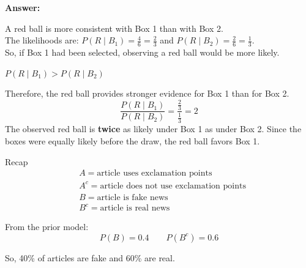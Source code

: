 \documentclass[12pt]{beamer}
\begin{document}
{\begin{frame}{}
\begin{block}{}
\begin{center}
\end{center}
\end{block}
\end{frame}

\begin{frame}{}
\begin{block}{}
\small
\textbf{Answer:}
{\color{blue}
A red ball is more consistent with Box 1 than with Box 2.\\[.1cm]

The likelihoods are:
$P(R\mid B_1)=\frac46=\frac23$
and
$P(R\mid B_2)=\frac26=\frac13.$\\[.1cm]

So, if Box 1 had been selected, observing a red ball would be more likely.

\begin{center}
$P(R\mid B_1) > P(R\mid B_2)$
\end{center}

Therefore, the red ball provides stronger evidence for Box 1 than for Box 2.
\[
\frac{P(R\mid B_1)}{P(R\mid B_2)} = \frac{\frac23}{\frac13} = 2
\]
The observed red ball is \textbf{twice} as likely under Box 1 as under Box 2. Since the boxes were equally likely before the draw, the red ball favors Box 1.
}
\end{block}
\end{frame}
}

\begin{frame}{}
\begin{block}{Recap}
\[
\begin{aligned}
&A   = \text{article uses exclamation points}\\
&A^c = \text{article does not use exclamation points}\\
&B    = \text{article is fake news}\\
&B^c  = \text{article is real news}
\end{aligned}
\]
\vspace{0.2cm}

From the prior model:
\[
P(B)=0.4
\qquad
P(B^c)=0.6
\]

So, 40\% of articles are fake and 60\% are real.
\end{block}
\end{frame}
\end{document}
